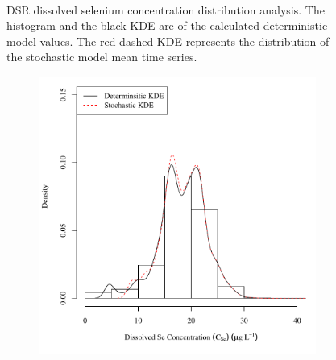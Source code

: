 \begin{linenumbers}
\begin{landscape}
\begin{figure}
\begin{subfigure}{0.7\textwidth}
		\end{subfigure}\\
		\caption[DSR dissolved selenium concentration distribution analysis.]{DSR dissolved selenium concentration distribution analysis.  The histogram and the black KDE are of the calculated deterministic model values.  The red dashed KDE represents the distribution of the stochastic model mean time series.}
		\label{fig:concCSeDist_DS}
	\end{figure}
\end{landscape}

\subfiguremid
\begin{landscape}
	\begin{figure}
		\begin{subfigure}{0.7\textwidth}
			\centering
			\includegraphics[width=\tableCustomSize]{"Figures/Results_DSR/Stochastic/c d&s est BIG"}
		\end{subfigure}%
		\begin{subfigure}{0.7\textwidth}
			\centering

\end{subfigure}
\end{figure}
\end{landscape}
\end{linenumbers}
